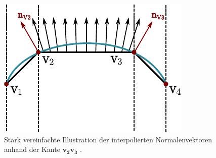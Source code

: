 \begin{figure}[H]
    \centering
    \includegraphics{img/phong_shading_mesh_normals.pdf}
    \caption{Stark vereinfachte Illustration der interpolierten
        Normalenvektoren anhand der Kante $\bm{v_{2}v_{3}}$
    \protect\footnotemark.}\label{fig:phong_shading_normals_illustration}
\end{figure}

